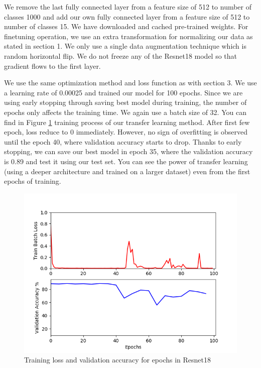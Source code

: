 \documentclass{article}
\begin{document}
We remove the last fully connected layer from a feature size of 512 to number of classes 1000 and add our own fully connected layer from a feature size of 512 to number of classes 15. We have downloaded and cached pre-trained weights. For finetuning operation, we use an extra transformation for normalizing our data as stated in section 1. We only use a single data augmentation technique which is random horizontal flip. We do not freeze any of the Resnet18 model so that gradient flows to the first layer.

We use the same optimization method and loss function as with section 3. We use a learning rate of 0.00025 and trained our model for 100 epochs. Since we are using early stopping through saving best model during training, the number of epochs only affects the training time. We again use a batch size of 32. You can find in Figure \ref{fig:resnet18TrainingProcess} training process of our transfer learning method. After first few epoch, loss reduce to 0 immediately. However, no sign of overfitting is observed until the epoch 40, where validation accuracy starts to drop. Thanks to early stopping, we can save our best model in epoch 35, where the validation accuracy is 0.89 and test it using our test set. You can see the power of transfer learning (using a deeper architecture and trained on a larger dataset) even from the first epochs of training.

\begin{figure}
  \includegraphics[width=\linewidth]{resnet18TrainingProcess.png}
  \caption{Training loss and validation accuracy for epochs in Resnet18}
  \label{fig:resnet18TrainingProcess}
\end{figure}
\end{document}
